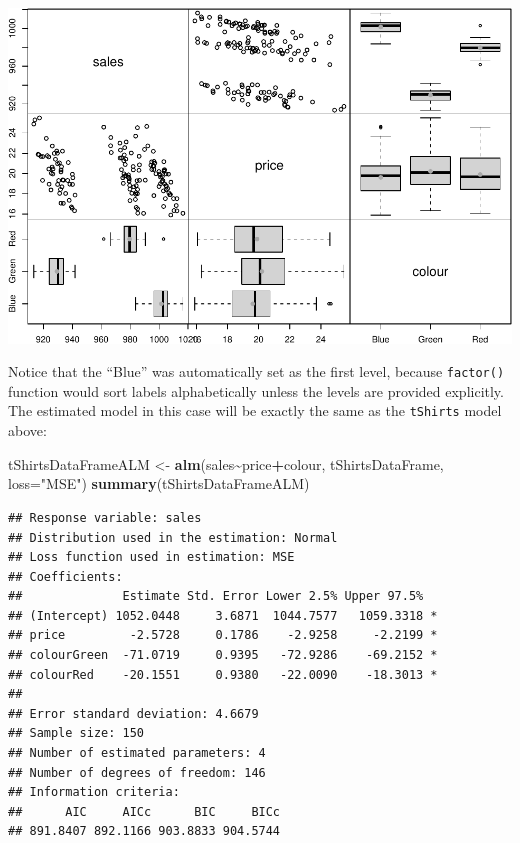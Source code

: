 \documentclass[
]{book}
\newenvironment{Shaded}{\begin{snugshade}}{\end{snugshade}}
\newcommand{\DataTypeTok}[1]{\textcolor[rgb]{0.13,0.29,0.53}{#1}}
\newcommand{\KeywordTok}[1]{\textcolor[rgb]{0.13,0.29,0.53}{\textbf{#1}}}
\newcommand{\NormalTok}[1]{#1}
\newcommand{\OperatorTok}[1]{\textcolor[rgb]{0.81,0.36,0.00}{\textbf{#1}}}
\newcommand{\StringTok}[1]{\textcolor[rgb]{0.31,0.60,0.02}{#1}}
\theoremstyle{definition}
\theoremstyle{definition}
\theoremstyle{definition}
\theoremstyle{definition}
\theoremstyle{remark}
\begin{document}
\includegraphics{Svetunkov---Statistics-for-Business-Analytics_files/figure-latex/unnamed-chunk-80-1.pdf}

Notice that the ``Blue'' was automatically set as the first level, because \texttt{factor()} function would sort labels alphabetically unless the levels are provided explicitly. The estimated model in this case will be exactly the same as the \texttt{tShirts} model above:

\begin{Shaded}
\begin{Highlighting}[]
\NormalTok{tShirtsDataFrameALM \textless{}{-}}\StringTok{ }\KeywordTok{alm}\NormalTok{(sales}\OperatorTok{\textasciitilde{}}\NormalTok{price}\OperatorTok{+}\NormalTok{colour, tShirtsDataFrame, }\DataTypeTok{loss=}\StringTok{"MSE"}\NormalTok{)}
\KeywordTok{summary}\NormalTok{(tShirtsDataFrameALM)}
\end{Highlighting}
\end{Shaded}

\begin{verbatim}
## Response variable: sales
## Distribution used in the estimation: Normal
## Loss function used in estimation: MSE
## Coefficients:
##              Estimate Std. Error Lower 2.5% Upper 97.5%  
## (Intercept) 1052.0448     3.6871  1044.7577   1059.3318 *
## price         -2.5728     0.1786    -2.9258     -2.2199 *
## colourGreen  -71.0719     0.9395   -72.9286    -69.2152 *
## colourRed    -20.1551     0.9380   -22.0090    -18.3013 *
## 
## Error standard deviation: 4.6679
## Sample size: 150
## Number of estimated parameters: 4
## Number of degrees of freedom: 146
## Information criteria:
##      AIC     AICc      BIC     BICc 
## 891.8407 892.1166 903.8833 904.5744
\end{verbatim}
\end{document}
